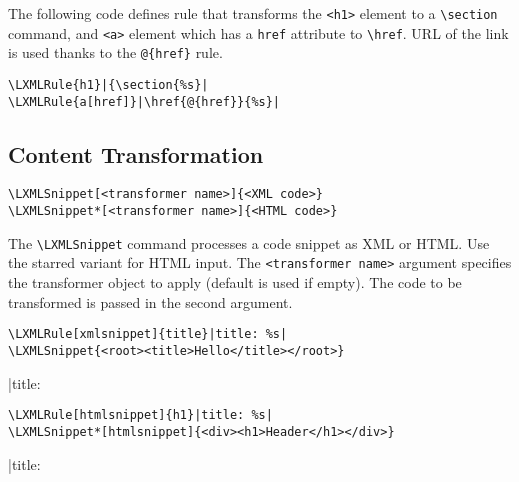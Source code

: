 \documentclass{ltxdoc}
\begin{document}
The following code defines rule that transforms the \verb|<h1>| element to a \verb|\section| command, 
and \verb|<a>| element which has a \verb|href| attribute to \verb|\href|. URL of the link is used 
thanks to the \verb|@{href}| rule. 

\begin{verbatim}
\LXMLRule{h1}|{\section{%s}|
\LXMLRule{a[href]}|\href{@{href}}{%s}|
\end{verbatim}

\subsection{Content Transformation}

\begin{verbatim}
\LXMLSnippet[<transformer name>]{<XML code>}
\LXMLSnippet*[<transformer name>]{<HTML code>}
\end{verbatim}

\noindent The \verb|\LXMLSnippet| command processes a code snippet as XML or HTML. 
Use the starred variant for HTML
input. The \texttt{<transformer name>} argument specifies the transformer object to apply
(default is used if empty). The code to be transformed is passed in the second
argument.

\medskip

\begin{verbatim}
\LXMLRule[xmlsnippet]{title}|title: %s|
\LXMLSnippet{<root><title>Hello</title></root>}
\end{verbatim}

\begin{framed}
|title: %
\end{framed}

\begin{verbatim}
\LXMLRule[htmlsnippet]{h1}|title: %s|
\LXMLSnippet*[htmlsnippet]{<div><h1>Header</h1></div>}
\end{verbatim}

\begin{framed}
|title: %
\end{framed}
\end{document}
